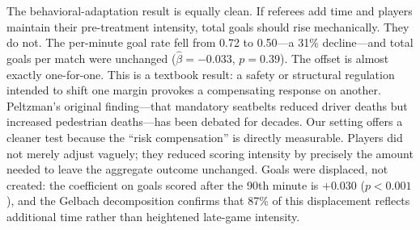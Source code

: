 The behavioral-adaptation result is equally clean.
If referees add time and players maintain their pre-treatment intensity,
total goals should rise mechanically.
They do not.
The per-minute goal rate fell from 0.72 to 0.50---a 31\% decline---and
total goals per match were unchanged
($\hat{\beta}=-0.033$, $p=0.39$).
The offset is almost exactly one-for-one.
This is a textbook \citet{Peltzman1975} result: a safety or structural
regulation intended to shift one margin provokes a compensating response
on another.
Peltzman's original finding---that mandatory seatbelts reduced driver
deaths but increased pedestrian deaths---has been debated for decades.
Our setting offers a cleaner test because the ``risk compensation'' is
directly measurable.
Players did not merely adjust vaguely; they reduced scoring intensity by
precisely the amount needed to leave the aggregate outcome unchanged.
Goals were displaced, not created: the coefficient on goals scored after
the 90th minute is $+0.030$ ($p<0.001$), and the Gelbach decomposition
confirms that 87\% of this displacement reflects additional time
rather than heightened late-game intensity.


